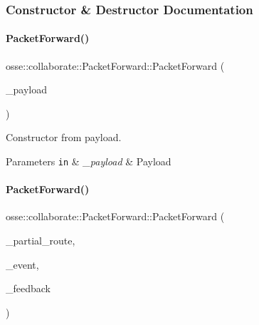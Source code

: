 \subsubsection{Constructor \& Destructor Documentation}
\mbox{\label{classosse_1_1collaborate_1_1_packet_forward_aa9d4d7abe36998c9178db59950c18c51}} 
\paragraph{\texorpdfstring{Packet\+Forward()}{PacketForward()}\hspace{0.1cm}{\footnotesize\ttfamily [1/2]}}
{\footnotesize\ttfamily osse\+::collaborate\+::\+Packet\+Forward\+::\+Packet\+Forward (\begin{DoxyParamCaption}\item[{const std\+::vector$<$ uint8\+\_\+t $>$ \&}]{\+\_\+payload }\end{DoxyParamCaption})\hspace{0.3cm}{\ttfamily [explicit]}}



Constructor from payload. 


\begin{DoxyParams}[1]{Parameters}
\mbox{\tt in}  & {\em \+\_\+payload} & Payload \\
\hline
\end{DoxyParams}
\mbox{\label{classosse_1_1collaborate_1_1_packet_forward_a1b033de632232702fdc6c4b58b747b73}} 
\paragraph{\texorpdfstring{Packet\+Forward()}{PacketForward()}\hspace{0.1cm}{\footnotesize\ttfamily [2/2]}}
{\footnotesize\ttfamily osse\+::collaborate\+::\+Packet\+Forward\+::\+Packet\+Forward (\begin{DoxyParamCaption}\item[{const \hyperlink{classosse_1_1collaborate_1_1_packet_forward_a4627beb1294e822a7eec6038969a5da0}{Partial\+Route} \&}]{\+\_\+partial\+\_\+route,  }\item[{const \hyperlink{classosse_1_1collaborate_1_1_packet_forward_a66c37a806c4b486cb1af64409865fa4b}{Event} \&}]{\+\_\+event,  }\item[{const uint16\+\_\+t \&}]{\+\_\+feedback }\end{DoxyParamCaption})}



